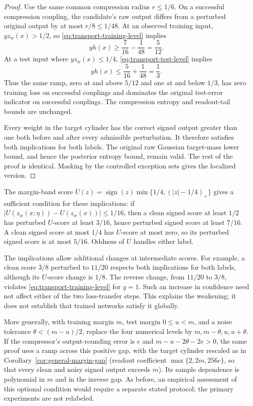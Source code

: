 \begin{proof}
Use the same common compression radius $r\le1/6$. On a successful
compression coupling, the candidate's raw output differs from a
perturbed original output by at most $r/8\le1/48$.
At an observed training input, $yz_w(x)>1/2$, so
\eqref{eq:transport-training-level} implies
\[
 yh(x)\ge\frac7{16}-\frac1{48}=\frac5{12}.
\]
At a test input where $yz_w(x)\le1/4$,
\eqref{eq:transport-test-level} implies
\[
 yh(x)\le\frac5{16}+\frac1{48}=\frac13.
\]
Thus the same ramp, zero at and above $5/12$ and one at and below
$1/3$, has zero training loss on successful couplings and dominates
the original test-error indicator on successful couplings. The
compression entropy and readout-tail bounds are unchanged.

Every weight in the target cylinder has the correct signed output
greater than one both before and after every admissible perturbation.
It therefore satisfies both implications for both labels. The original
raw Gaussian target-mass lower bound, and hence the posterior entropy
bound, remain valid. The rest of the proof is identical. Masking by the
controlled exception sets gives the localized version.
\end{proof}

The margin-band score
$U(z)=\operatorname{sign}(z)\min\{1/4,(|z|-1/4)_+\}$ gives a
sufficient condition for these implications: if
$|U(z_w(x;\eta))-U(z_w(x))|\le1/16$, then a clean signed score at
least $1/2$ has perturbed $U$-score at least $3/16$, hence perturbed
signed score at least $7/16$. A clean signed score at most $1/4$ has
$U$-score at most zero, so its perturbed signed score is at most
$5/16$. Oddness of $U$ handles either label.

The implications allow additional changes at intermediate scores.
For example, a clean score $3/8$ perturbed to $11/20$ respects both
implications for both labels, although its $U$-score change is $1/8$.
The reverse change, from $11/20$ to $3/8$, violates
\eqref{eq:transport-training-level} for $y=1$.
Such an increase in confidence need not affect either of the two
loss-transfer steps. This explains the weakening; it does not establish
that trained networks satisfy it globally.

More generally, with training margin $m$, test margin $0\le u<m$, and a
noise tolerance $\theta<(m-u)/2$, replace the four numerical levels by
$m,m-\theta,u,u+\theta$. If the compressor's output-rounding error is $e$ and
$m-u-2\theta-2e>0$, the same proof uses a ramp across this positive gap,
with the target cylinder rescaled as in
Corollary~\ref{cor:general-margin-gap} (readout coefficient
$\max\{2,2m,256c\}$, so that every clean and noisy signed output exceeds
$m$). Its sample dependence is polynomial in $m$ and in the inverse gap. As before,
an empirical assessment of this optional condition would require a
separate stated protocol; the primary experiments are not relabeled.
